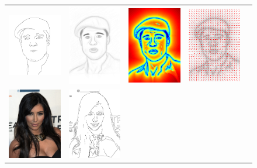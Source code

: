 \begin{figure}
\begin{tabular}{ccccc}
\includegraphics[width=1in]{figures/imagetable/edges_bp.png} &
\includegraphics[width=1in]    {figures/imagetable/avg_bp.png} &
\includegraphics[width=1in]   {figures/imagetable/mag_bp.png} &
\includegraphics[width=1in]     {figures/imagetable/dir_bp.png} \\
\includegraphics[width=1in]{figures/imagetable/image_kk.png} &
\includegraphics[width=1in]{figures/imagetable/edges_kk.png} &

\end{tabular}
\end{figure}
